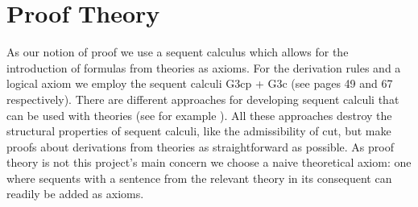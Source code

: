\chapter{Proof Theory}\label{chapter:proof-theory}
As our notion of proof we use a sequent calculus which allows for the introduction of formulas from theories as axioms. For the derivation rules and a logical axiom we employ the sequent calculi G3cp + G3c (see \cite{negri:2001} pages 49 and 67 respectively). There are different approaches for developing sequent calculi that can be used with theories (see for example \cite[Chapter 6]{negri:2001}). All these approaches destroy the structural properties of sequent calculi, like the admissibility of cut, but make proofs about derivations from theories as straightforward as possible. As proof theory is not this project's main concern we choose a naive theoretical axiom: one where sequents with a sentence from the relevant theory in its consequent can readily be added as axioms.
